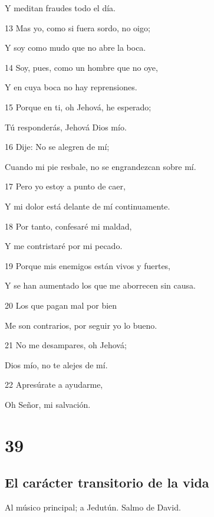 \par Y meditan fraudes todo el día.
\par 13 Mas yo, como si fuera sordo, no oigo;
\par Y soy como mudo que no abre la boca.
\par 14 Soy, pues, como un hombre que no oye,
\par Y en cuya boca no hay reprensiones.
\par 15 Porque en ti, oh Jehová, he esperado;
\par Tú responderás, Jehová Dios mío.
\par 16 Dije: No se alegren de mí;
\par Cuando mi pie resbale, no se engrandezcan sobre mí.
\par 17 Pero yo estoy a punto de caer,
\par Y mi dolor está delante de mí continuamente.
\par 18 Por tanto, confesaré mi maldad,
\par Y me contristaré por mi pecado.
\par 19 Porque mis enemigos están vivos y fuertes,
\par Y se han aumentado los que me aborrecen sin causa.
\par 20 Los que pagan mal por bien
\par Me son contrarios, por seguir yo lo bueno.
\par 21 No me desampares, oh Jehová;
\par Dios mío, no te alejes de mí.
\par 22 Apresúrate a ayudarme,
\par Oh Señor, mi salvación.

\chapter{39}

\section*{El carácter transitorio de la vida}

\par Al músico principal; a Jedutún. Salmo de David.

